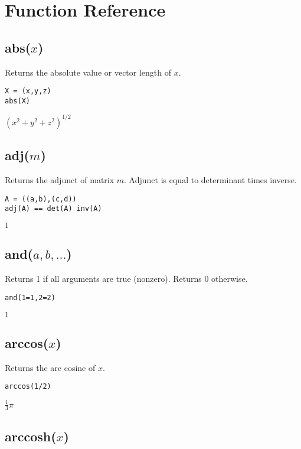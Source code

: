 \section{Function Reference}

\subsection*{abs($x$)}

Returns the absolute value or vector length of $x$.

{\color{blue}
\begin{verbatim}
X = (x,y,z)
abs(X)
\end{verbatim}
}

\noindent
$\left(x^2+y^2+z^2\right)^{1/2}$

\subsection*{adj($m$)}

Returns the adjunct of matrix $m$.
Adjunct is equal to determinant times inverse.

{\color{blue}
\begin{verbatim}
A = ((a,b),(c,d))
adj(A) == det(A) inv(A)
\end{verbatim}
}

\noindent
$1$

\subsection*{and($a,b,\ldots$)}

Returns 1 if all arguments are true (nonzero).
Returns 0 otherwise.

{\color{blue}
\begin{verbatim}
and(1=1,2=2)
\end{verbatim}
}

\noindent
$1$

\subsection*{arccos($x$)}

Returns the arc cosine of $x$.

{\color{blue}
\begin{verbatim}
arccos(1/2)
\end{verbatim}
}

\noindent
$\tfrac{1}{3}\pi$

\subsection*{arccosh($x$)}

